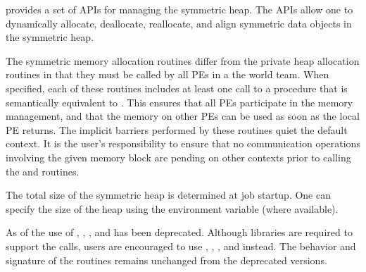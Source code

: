\openshmem provides a set of \acp{API} for managing the symmetric heap. The
\acp{API} allow one to dynamically allocate, deallocate, reallocate, and align
symmetric data objects in the symmetric heap.

The symmetric memory allocation routines differ from the private heap
allocation routines in that they must be called by all \acp{PE} in a
the world team.  When specified, each of these routines includes at
least one call to a procedure that is semantically equivalent to
.  This ensures that all \acp{PE}
participate in the memory management, and that the memory on other
\acp{PE} can be used as soon as the local \ac{PE} returns.  The
implicit barriers performed by these routines quiet the default
context.  It is the user's responsibility to ensure that no
communication operations involving the given memory block are pending
on other contexts prior to calling the  and
 routines.

The total size of the symmetric heap is determined at job startup.  One can
specify the size of the heap using the  environment
variable (where available).	

\begin{DeprecateBlock}
  As of \openshmem[1.2] the use of , ,
  ,  and  has been deprecated. Although \openshmem
  libraries are required to support the calls, users are encouraged to use
  , , , and
   instead.  The behavior and signature  of the routines
  remains unchanged from the deprecated versions.
\end{DeprecateBlock}



